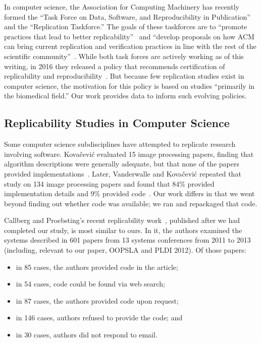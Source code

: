 \documentclass[10pt,conference]{IEEEtran}
\begin{document}
In computer science, the Association for Computing Machinery has
recently formed the ``Task Force on Data, Software, and Reproducibility in Publication''
and the ``Replication Taskforce.''
The goals of these taskforces are to 
``promote practices that lead to better replicability''~\cite{acmDataTaskforce} and 
``develop proposals on how ACM can bring current replication and 
verification practices in line with the rest of the scientific 
community''~\cite{acmRepTaskforce}.
While both task forces are actively working as of this writing, 
in 2016 they released a policy that recommends certification of
replicability and reproducibility~\cite{acmArtifactPolicy}.
But because few replication studies exist in computer science,
the motivation for this policy is based on studies
``primarily in the biomedical field.''
Our work provides data to inform such evolving policies.

\subsection{Replicability Studies in Computer Science}

Some computer science subdisciplines have attempted to replicate
research involving software.
Kova{\v{c}}evi{\'c} evaluated 15 image processing papers,
finding that algorithm descriptions were
generally adequate, but that none of the papers provided
implementations~\cite{kovacevic2007encourage}.
Later, Vanderwalle and Kova{\v{c}}evi{\'c} repeated that study on 134 
image processing papers and found that 84\% provided implementation details
and 9\% provided code~\cite{vandewalle2009reproducible}. 
Our work differs in that we went beyond finding out whether code was available;
we ran and repackaged that code.

Callberg and Proebsting's recent replicability work~\cite{collberg2016repeatability,proebsting2015repeatability},
published after we had completed our study, is most similar to ours. 
In it, the authors examined the systems described in 
601 papers from 13 systems conferences from 2011 to 2013
(including, relevant to our paper, OOPSLA and PLDI 2012).
Of those papers:

\begin{itemize}   
\item in 85 cases, the authors provided code in the article; 
\item in 54 cases, code could be found via web search;
\item in 87 cases, the authors provided code upon request;
\item in 146 cases, authors refused to provide the code; and
\item in 30 cases, authors did not respond to email.
\end{itemize}
\end{document}
